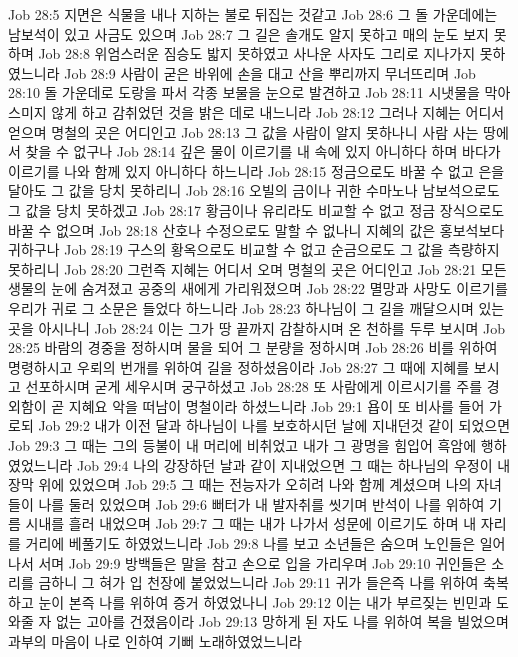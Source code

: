 Job 28:5  지면은 식물을 내나 지하는 불로 뒤집는 것같고
Job 28:6  그 돌 가운데에는 남보석이 있고 사금도 있으며
Job 28:7  그 길은 솔개도 알지 못하고 매의 눈도 보지 못하며
Job 28:8  위엄스러운 짐승도 밟지 못하였고 사나운 사자도 그리로 지나가지 못하였느니라
Job 28:9  사람이 굳은 바위에 손을 대고 산을 뿌리까지 무너뜨리며
Job 28:10  돌 가운데로 도랑을 파서 각종 보물을 눈으로 발견하고
Job 28:11  시냇물을 막아 스미지 않게 하고 감취었던 것을 밝은 데로 내느니라
Job 28:12  그러나 지혜는 어디서 얻으며 명철의 곳은 어디인고
Job 28:13  그 값을 사람이 알지 못하나니 사람 사는 땅에서 찾을 수 없구나
Job 28:14  깊은 물이 이르기를 내 속에 있지 아니하다 하며 바다가 이르기를 나와 함께 있지 아니하다 하느니라
Job 28:15  정금으로도 바꿀 수 없고 은을 달아도 그 값을 당치 못하리니
Job 28:16  오빌의 금이나 귀한 수마노나 남보석으로도 그 값을 당치 못하겠고
Job 28:17  황금이나 유리라도 비교할 수 없고 정금 장식으로도 바꿀 수 없으며
Job 28:18  산호나 수정으로도 말할 수 없나니 지혜의 값은 홍보석보다 귀하구나
Job 28:19  구스의 황옥으로도 비교할 수 없고 순금으로도 그 값을 측량하지못하리니
Job 28:20  그런즉 지혜는 어디서 오며 명철의 곳은 어디인고
Job 28:21  모든 생물의 눈에 숨겨졌고 공중의 새에게 가리워졌으며
Job 28:22  멸망과 사망도 이르기를 우리가 귀로 그 소문은 들었다 하느니라
Job 28:23  하나님이 그 길을 깨달으시며 있는 곳을 아시나니
Job 28:24  이는 그가 땅 끝까지 감찰하시며 온 천하를 두루 보시며
Job 28:25  바람의 경중을 정하시며 물을 되어 그 분량을 정하시며
Job 28:26  비를 위하여 명령하시고 우뢰의 번개를 위하여 길을 정하셨음이라
Job 28:27  그 때에 지혜를 보시고 선포하시며 굳게 세우시며 궁구하셨고
Job 28:28  또 사람에게 이르시기를 주를 경외함이 곧 지혜요 악을 떠남이 명철이라 하셨느니라
Job 29:1  욥이 또 비사를 들어 가로되
Job 29:2  내가 이전 달과 하나님이 나를 보호하시던 날에 지내던것 같이 되었으면
Job 29:3  그 때는 그의 등불이 내 머리에 비취었고 내가 그 광명을 힘입어 흑암에 행하였었느니라
Job 29:4  나의 강장하던 날과 같이 지내었으면 그 때는 하나님의 우정이 내 장막 위에 있었으며
Job 29:5  그 때는 전능자가 오히려 나와 함께 계셨으며 나의 자녀들이 나를 둘러 있었으며
Job 29:6  뻐터가 내 발자취를 씻기며 반석이 나를 위하여 기름 시내를 흘러 내었으며
Job 29:7  그 때는 내가 나가서 성문에 이르기도 하며 내 자리를 거리에 베풀기도 하였었느니라
Job 29:8  나를 보고 소년들은 숨으며 노인들은 일어나서 서며
Job 29:9  방백들은 말을 참고 손으로 입을 가리우며
Job 29:10  귀인들은 소리를 금하니 그 혀가 입 천장에 붙었었느니라
Job 29:11  귀가 들은즉 나를 위하여 축복하고 눈이 본즉 나를 위하여 증거 하였었나니
Job 29:12  이는 내가 부르짖는 빈민과 도와줄 자 없는 고아를 건졌음이라
Job 29:13  망하게 된 자도 나를 위하여 복을 빌었으며 과부의 마음이 나로 인하여 기뻐 노래하였었느니라
